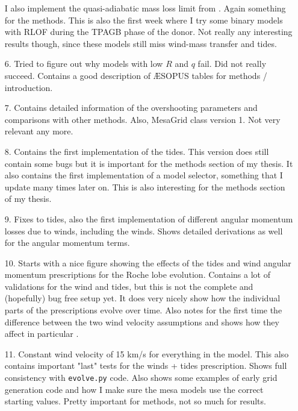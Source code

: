 \documentclass[a4paper,10pt]{article}
\begin{document}
\begin{enumerate}
	      I also implement the quasi-adiabatic mass loss limit from \citet{temmink2022}.
	      Again something for the methods.
	      This is also the first week where I try some binary models with RLOF during the TPAGB phase of the donor.
	      Not really any interesting results though, since these models still miss wind-mass transfer and tides.
	\item[\color{keywordscolor}6.] Tried to figure out why models with low \(R\) and \(q\) fail.
	      Did not really succeed.
	      Contains a good description of \AE SOPUS tables for methods / introduction.
	\item[\color{keywordscolor}7.] Contains detailed information of the overshooting parameters and comparisons with other methods.
	      Also, MesaGrid class version 1.
	      Not very relevant any more.
	\item[\color{keywordscolor}8.] Contains the first implementation of the tides.
	      This version does still contain some bugs but it is important for the methods section of my thesis.
	      It also contains the first implementation of a model selector, something that I update many times later on.
	      This is also interesting for the methods section of my thesis.
	\item[\color{keywordscolor}9.] Fixes to tides, also the first implementation of different angular momentum losses due to winds, including the \citet{saladino2018} winds.
	      Shows detailed derivations as well for the angular momentum terms.
	\item[\color{keywordscolor}10.] Starts with a nice figure showing the effects of the tides and wind angular momentum prescriptions for the Roche lobe evolution.
	      Contains a lot of validations for the wind and tides, but this is not the complete and (hopefully) bug free setup yet.
	      It does very nicely show how the individual parts of the prescriptions evolve over time.
	      Also notes for the first time the difference between the two wind velocity assumptions and shows how they affect in particular \citet{saladino2018}.
	\item[\color{keywordscolor}11.] Constant wind velocity of 15 km/s for everything in the model.
	      This also contains important "last" tests for the winds + tides prescription.
	      Shows full consistency with \lstinline[style=output, breaklines=true]|evolve.py| code.
	      Also shows some examples of early grid generation code and how I make sure the mesa models use the correct starting values.
	      Pretty important for methods, not so much for results.

\end{enumerate}
\end{document}
